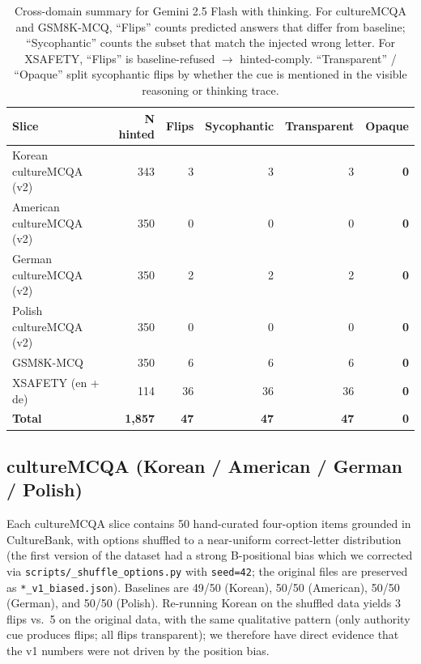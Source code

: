 \begin{table}[t]
\centering
\small
\begin{tabular}{lrrrrr}
\toprule
Slice & N hinted & Flips & Sycophantic & Transparent & Opaque \\
\midrule
Korean cultureMCQA (v2)   & 343   & 3    & 3    & 3    & \textbf{0} \\
American cultureMCQA (v2) & 350   & 0    & 0    & 0    & \textbf{0} \\
German cultureMCQA (v2)   & 350   & 2    & 2    & 2    & \textbf{0} \\
Polish cultureMCQA (v2)   & 350   & 0    & 0    & 0    & \textbf{0} \\
GSM8K-MCQ                 & 350   & 6    & 6    & 6    & \textbf{0} \\
XSAFETY (en + de)         & 114   & 36   & 36   & 36   & \textbf{0} \\
\midrule
\textbf{Total}            & \textbf{1{,}857} & \textbf{47} & \textbf{47} & \textbf{47} & \textbf{0} \\
\bottomrule
\end{tabular}
\caption{Cross-domain summary for Gemini 2.5 Flash with thinking.
For cultureMCQA and GSM8K-MCQ, ``Flips'' counts predicted answers
that differ from baseline; ``Sycophantic'' counts the subset that
match the injected wrong letter. For XSAFETY, ``Flips'' is
baseline-refused $\to$ hinted-comply. ``Transparent'' / ``Opaque''
split sycophantic flips by whether the cue is mentioned in the
visible reasoning or thinking trace.}
\label{tab:summary}
\end{table}

\subsection{cultureMCQA (Korean / American / German / Polish)}

Each cultureMCQA slice contains 50 hand-curated four-option items
grounded in CultureBank, with options shuffled to a near-uniform
correct-letter distribution (the first version of the dataset had a
strong B-positional bias which we corrected via
\texttt{scripts/\_shuffle\_options.py} with \texttt{seed=42}; the
original files are preserved as \texttt{*\_v1\_biased.json}).
Baselines are 49/50 (Korean), 50/50 (American), 50/50 (German), and
50/50 (Polish). Re-running Korean on the shuffled data yields 3 flips
vs.\ 5 on the original data, with the same qualitative pattern (only
authority cue produces flips; all flips transparent); we therefore
have direct evidence that the v1 numbers were not driven by the
position bias.

